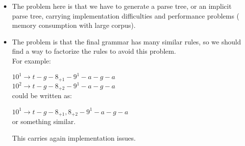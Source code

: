 	\begin{itemize}
		\item The problem here is that we have to generate a parse tree, or an implicit 
	parse tree, carrying implementation difficulties and performance problems (
	memory consumption with large corpus).

		\item The problem is that the final grammar has many similar rules, so we should find
	a way to factorize the rules to avoid this problem.\\

	For example: 

	$10^1 \rightarrow t - g - 8_{+1} - 9^1 - a - g - a$ \\

	$10^2 \rightarrow t - g - 8_{+2} - 9^1 - a - g - a$\\

	could be written as:

	$10^1 \rightarrow t - g - 8_{+1}, 8_{+2} - 9^1 - a - g - a$ \\

	or something similar.

		This carries again implementation issues.
		
	\end{itemize}








